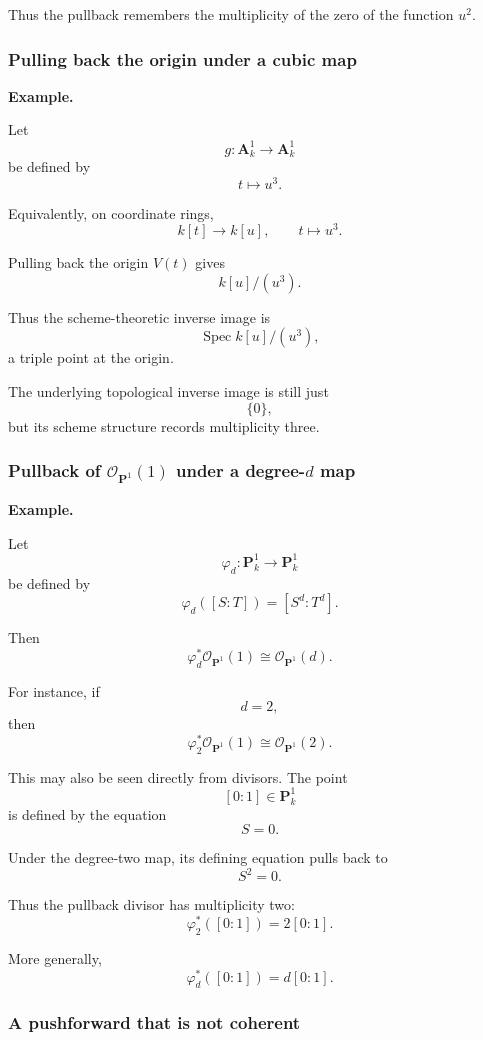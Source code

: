 \documentclass[12pt,a4paper]{article}
\theoremstyle{notespace}
\begin{document}
Thus the pullback remembers the multiplicity of the zero of the function \(u^2\).

\subsubsection{Pulling back the origin under a cubic map}

\textbf{Example.}

Let
\[
g:\mathbf A^1_k\longrightarrow\mathbf A^1_k
\]
be defined by
\[
t\longmapsto u^3.
\]

Equivalently, on coordinate rings,
\[
k[t]\longrightarrow k[u],
\qquad
t\longmapsto u^3.
\]

Pulling back the origin \(V(t)\) gives
\[
k[u]/(u^3).
\]

Thus the scheme-theoretic inverse image is
\[
\operatorname{Spec}k[u]/(u^3),
\]
a triple point at the origin.

The underlying topological inverse image is still just
\[
\{0\},
\]
but its scheme structure records multiplicity three.

\subsubsection{Pullback of \(\mathcal O_{\mathbf P^1}(1)\) under a degree-\(d\) map}

\textbf{Example.}

Let
\[
\varphi_d:\mathbf P^1_k\longrightarrow\mathbf P^1_k
\]
be defined by
\[
\varphi_d([S:T])=[S^d:T^d].
\]

Then
\[
\varphi_d^*\mathcal O_{\mathbf P^1}(1)
\cong
\mathcal O_{\mathbf P^1}(d).
\]

For instance, if
\[
d=2,
\]
then
\[
\varphi_2^*\mathcal O_{\mathbf P^1}(1)
\cong
\mathcal O_{\mathbf P^1}(2).
\]

This may also be seen directly from divisors. The point
\[
[0:1]\in\mathbf P^1_k
\]
is defined by the equation
\[
S=0.
\]

Under the degree-two map, its defining equation pulls back to
\[
S^2=0.
\]

Thus the pullback divisor has multiplicity two:
\[
\varphi_2^*([0:1])=2[0:1].
\]

More generally,
\[
\varphi_d^*([0:1])=d[0:1].
\]

\subsubsection{A pushforward that is not coherent}
\end{document}
